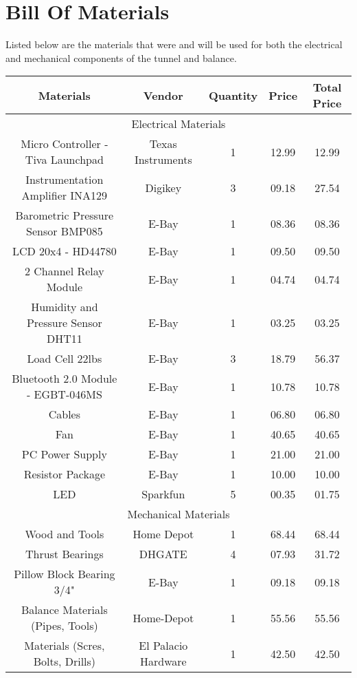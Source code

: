 \section{Bill Of Materials}
	Listed below are the materials that were and will be used for both the electrical and mechanical
	components of the tunnel and balance. \\

	\noindent
	\begin{tabular}{|c|c|c|c|c|}
		\hline
			\textbf{Materials} & \textbf{Vendor} & \textbf{Quantity} & \textbf{Price} & \textbf{Total Price}  \\
		\hline
			\multicolumn{5}{|c|}{Electrical Materials} \\
		\hline
			Micro Controller - Tiva Launchpad 	& Texas Instruments 	& 1 & 12.99 & 12.99 \\
			Instrumentation Amplifier INA129 	& Digikey 				& 3 & 09.18 & 27.54 \\
			Barometric Pressure Sensor BMP085 	& E-Bay 				& 1 & 08.36 & 08.36 \\
			LCD 20x4 - HD44780				 	& E-Bay 				& 1 & 09.50 & 09.50 \\
			2 Channel Relay Module			 	& E-Bay 				& 1 & 04.74 & 04.74 \\
			Humidity and Pressure Sensor DHT11	& E-Bay 				& 1 & 03.25 & 03.25 \\
			Load Cell 22lbs						& E-Bay					& 3 & 18.79 & 56.37 \\
			Bluetooth 2.0 Module - EGBT-046MS	& E-Bay					& 1 & 10.78 & 10.78 \\
			Cables								& E-Bay					& 1 & 06.80 & 06.80 \\
			Fan									& E-Bay					& 1 & 40.65 & 40.65 \\
			PC Power Supply						& E-Bay					& 1 & 21.00 & 21.00 \\
			Resistor Package					& E-Bay					& 1 & 10.00	& 10.00 \\
			LED									& Sparkfun				& 5 & 00.35 & 01.75 \\

		\hline
			\multicolumn{5}{|c|}{Mechanical Materials} \\
		\hline
			Wood and Tools						& Home Depot			& 1 & 68.44 & 68.44 \\
			Thrust Bearings						& DHGATE				& 4 & 07.93 & 31.72 \\
			Pillow Block Bearing 3/4"			& E-Bay					& 1 & 09.18 & 09.18 \\
			Balance Materials (Pipes, Tools)	& Home-Depot			& 1 & 55.56 & 55.56 \\
			Materials (Scres, Bolts, Drills)	& El Palacio Hardware	& 1 & 42.50 & 42.50 \\
		\hline
	\end{tabular} \\


\newpage
